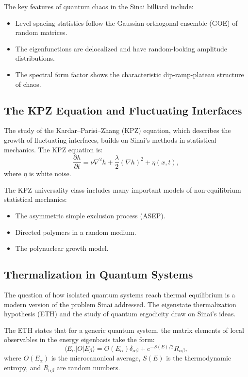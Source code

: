 The key features of quantum chaos in the Sinai billiard include:
\begin{itemize}
\item Level spacing statistics follow the Gaussian orthogonal ensemble (GOE) of random matrices.
\item The eigenfunctions are delocalized and have random-looking amplitude distributions.
\item The spectral form factor shows the characteristic dip-ramp-plateau structure of chaos.
\end{itemize}

\subsection{The KPZ Equation and Fluctuating Interfaces}

The study of the Kardar--Parisi--Zhang (KPZ) equation, which describes the growth of fluctuating interfaces, builds on Sinai's methods in statistical mechanics. The KPZ equation is:
\[
\frac{\partial h}{\partial t} = \nu \nabla^2 h + \frac{\lambda}{2} (\nabla h)^2 + \eta(x,t),
\]
where $\eta$ is white noise.

The KPZ universality class includes many important models of non-equilibrium statistical mechanics:
\begin{itemize}
\item The asymmetric simple exclusion process (ASEP).
\item Directed polymers in a random medium.
\item The polynuclear growth model.
\end{itemize}

\subsection{Thermalization in Quantum Systems}

The question of how isolated quantum systems reach thermal equilibrium is a modern version of the problem Sinai addressed. The eigenstate thermalization hypothesis (ETH) and the study of quantum ergodicity draw on Sinai's ideas.

The ETH states that for a generic quantum system, the matrix elements of local observables in the energy eigenbasis take the form:
\[
\langle E_\alpha | O | E_\beta \rangle = O(E_\alpha) \delta_{\alpha\beta} + e^{-S(E)/2} R_{\alpha\beta},
\]
where $O(E_\alpha)$ is the microcanonical average, $S(E)$ is the thermodynamic entropy, and $R_{\alpha\beta}$ are random numbers.

